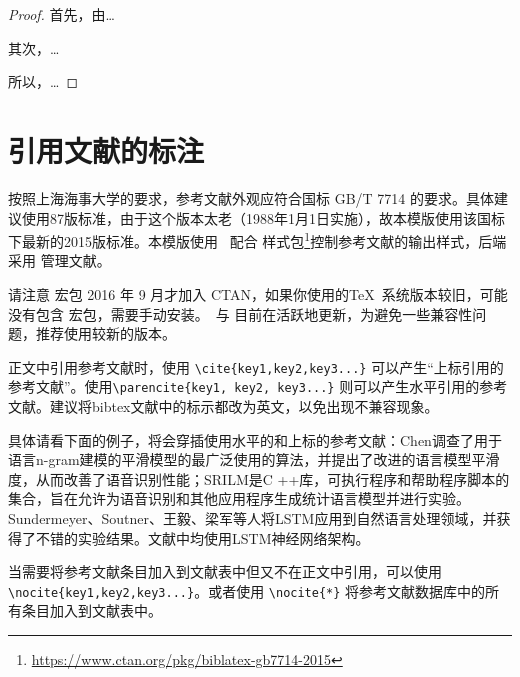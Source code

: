 \begin{proof}
  首先，由\dots

  其次，\dots

  所以，\dots
\end{proof}

\section{引用文献的标注}

按照上海海事大学的要求，参考文献外观应符合国标 GB/T 7714 的要求。具体建议使用87版标准，由于这个版本太老（1988年1月1日实施），故本模版使用该国标下最新的2015版标准。本模版使用 \BibLaTeX\ 配合  样式包\footnote{\url{https://www.ctan.org/pkg/biblatex-gb7714-2015}}控制参考文献的输出样式，后端采用  管理文献。

请注意  宏包 2016 年 9 月才加入 CTAN，如果你使用的\TeX\ 系统版本较旧，可能没有包含  宏包，需要手动安装。\BibLaTeX\ 与  目前在活跃地更新，为避免一些兼容性问题，推荐使用较新的版本。

正文中引用参考文献时，使用 \verb|\cite{key1,key2,key3...}| 可以产生“上标引用的参考文献”。使用\verb|\parencite{key1, key2, key3...}| 则可以产生水平引用的参考文献。建议将bibtex文献中的标示都改为英文，以免出现不兼容现象。

具体请看下面的例子，将会穿插使用水平的和上标的参考文献：Chen调查了用于语言n-gram建模的平滑模型的最广泛使用的算法，并提出了改进的语言模型平滑度，从而改善了语音识别性能\cite{chen1999empirical}；SRILM是C ++库，可执行程序和帮助程序脚本的集合，旨在允许为语音识别和其他应用程序生成统计语言模型并进行实验\cite{stolcke2002srilm}。Sundermeyer、Soutner、王毅、梁军等人将LSTM应用到自然语言处理领域，并获得了不错的实验结果\cite{sundermeyer2012lstm, soutner2013application, wangyi2018, liangjun2015}。文献\parencite{sundermeyer2012lstm, soutner2013application, wangyi2018, liangjun2015}中均使用LSTM神经网络架构。

当需要将参考文献条目加入到文献表中但又不在正文中引用，可以使用\verb|\nocite{key1,key2,key3...}|。或者使用 \verb|\nocite{*}| 将参考文献数据库中的所有条目加入到文献表中。\nocite{*}
